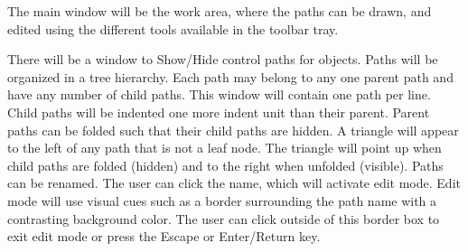 The main window will be the work area, where the paths can be drawn, and edited using the different tools available in the toolbar tray.

There will be a window to Show/Hide control paths for objects. Paths will be organized in a tree hierarchy. Each path may belong to any one parent path and have any number of child paths. This window will contain one path per line. Child paths will be indented one more indent unit than their parent. Parent paths can be folded such that their child paths are hidden. A triangle will appear to the left of any path that is not a leaf node. The triangle will point up when child paths are folded (hidden) and to the right when unfolded (visible). Paths can be renamed. The user can click the name, which will activate edit mode. Edit mode will use visual cues such as a border surrounding the path name with a contrasting background color. The user can click outside of this border box to exit edit mode or press the Escape or Enter/Return key.

